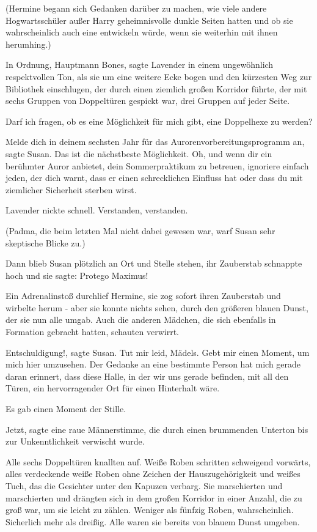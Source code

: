 (Hermine begann sich Gedanken darüber zu machen, wie viele andere
Hogwartsschüler außer Harry geheimnisvolle dunkle Seiten hatten und ob sie
wahrscheinlich auch eine entwickeln würde, wenn sie weiterhin mit ihnen
herumhing.)

\glqq{}In Ordnung, Hauptmann Bones\grqq{}, sagte Lavender in einem ungewöhnlich
respektvollen Ton, als sie um eine weitere Ecke bogen und den kürzesten Weg zur
Bibliothek einschlugen, der durch einen ziemlich großen Korridor führte, der mit
sechs Gruppen von Doppeltüren gespickt war, drei Gruppen auf jeder Seite.

\glqq{}Darf ich fragen, ob es eine Möglichkeit für mich gibt, eine Doppelhexe zu
werden?\grqq{}

\glqq{}Melde dich in deinem sechsten Jahr für das Aurorenvorbereitungsprogramm
an\grqq{}, sagte Susan. \glqq{}Das ist die nächstbeste Möglichkeit. Oh, und wenn
dir ein berühmter Auror anbietet, dein Sommerpraktikum zu betreuen, ignoriere
einfach jeden, der dich warnt, dass er einen schrecklichen Einfluss hat oder
dass du mit ziemlicher Sicherheit sterben wirst.\grqq{}

Lavender nickte schnell. \glqq{}Verstanden, verstanden.\grqq{}

(Padma, die beim letzten Mal nicht dabei gewesen war, warf Susan sehr skeptische
Blicke zu.)

Dann blieb Susan plötzlich an Ort und Stelle stehen, ihr Zauberstab schnappte
hoch und sie sagte: \glqq{}Protego Maximus!\grqq{}

Ein Adrenalinstoß durchlief Hermine, sie zog sofort ihren Zauberstab und
wirbelte herum - aber sie konnte nichts sehen, durch den größeren blauen Dunst,
der sie nun alle umgab. Auch die anderen Mädchen, die sich ebenfalls in
Formation gebracht hatten, schauten verwirrt.

\glqq{}Entschuldigung!\grqq{}, sagte Susan. \glqq{}Tut mir leid, Mädels. Gebt mir
einen Moment, um mich hier umzusehen. Der Gedanke an eine bestimmte Person hat
mich gerade daran erinnert, dass diese Halle, in der wir uns gerade befinden,
mit all den Türen, ein hervorragender Ort für einen Hinterhalt wäre.\grqq{}

Es gab einen Moment der Stille.

\glqq{}Jetzt\grqq{}, sagte eine raue Männerstimme, die durch einen brummenden
Unterton bis zur Unkenntlichkeit verwischt wurde.

Alle sechs Doppeltüren knallten auf. Weiße Roben schritten schweigend vorwärts,
alles verdeckende weiße Roben ohne Zeichen der Hauszugehörigkeit und weißes
Tuch, das die Gesichter unter den Kapuzen verbarg. Sie marschierten und
marschierten und drängten sich in dem großen Korridor in einer Anzahl, die zu
groß war, um sie leicht zu zählen. Weniger als fünfzig Roben, wahrscheinlich.
Sicherlich mehr als dreißig. Alle waren sie bereits von blauem Dunst umgeben.

